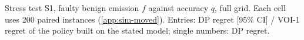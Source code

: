 \begin{table}[!htbp]
\centering
\caption{Stress test S1, faulty benign emission $f$ against accuracy $q$, full grid. Each cell uses 200 paired instances (\cref{app:sim-moved}). Entries: DP regret [95\% CI] / VOI-1 regret of the policy built on the stated model; single numbers: DP regret.}
\label{tab:s1-full}
\scriptsize
\setlength{\tabcolsep}{3pt}
\resizebox{\linewidth}{!}{}
\end{table}
